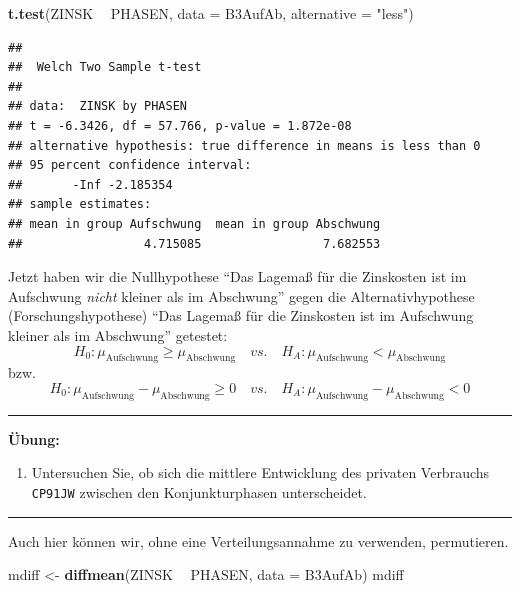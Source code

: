 \documentclass[12pt,ngerman,paper=a4,pagesize,DIV=13]{scrreprt}
\newenvironment{Shaded}{\begin{snugshade}}{\end{snugshade}}
\newcommand{\DataTypeTok}[1]{\textcolor[rgb]{0.13,0.29,0.53}{#1}}
\newcommand{\KeywordTok}[1]{\textcolor[rgb]{0.13,0.29,0.53}{\textbf{#1}}}
\newcommand{\NormalTok}[1]{#1}
\newcommand{\OperatorTok}[1]{\textcolor[rgb]{0.81,0.36,0.00}{\textbf{#1}}}
\newcommand{\StringTok}[1]{\textcolor[rgb]{0.31,0.60,0.02}{#1}}
\providecommand{\tightlist}{%
  \setlength{\itemsep}{0pt}\setlength{\parskip}{0pt}}
\begin{document}
\begin{Shaded}
\begin{Highlighting}[]
\KeywordTok{t.test}\NormalTok{(ZINSK }\OperatorTok{~}\StringTok{ }\NormalTok{PHASEN, }\DataTypeTok{data =}\NormalTok{ B3AufAb, }\DataTypeTok{alternative =} \StringTok{"less"}\NormalTok{)}
\end{Highlighting}
\end{Shaded}

\begin{verbatim}
## 
##  Welch Two Sample t-test
## 
## data:  ZINSK by PHASEN
## t = -6.3426, df = 57.766, p-value = 1.872e-08
## alternative hypothesis: true difference in means is less than 0
## 95 percent confidence interval:
##       -Inf -2.185354
## sample estimates:
## mean in group Aufschwung  mean in group Abschwung 
##                 4.715085                 7.682553
\end{verbatim}

Jetzt haben wir die Nullhypothese \enquote{Das Lagemaß für die
Zinskosten ist im Aufschwung \emph{nicht} kleiner als im Abschwung}
gegen die Alternativhypothese (Forschungshypothese) \enquote{Das Lagemaß
für die Zinskosten ist im Aufschwung kleiner als im Abschwung} getestet:
\[H_0: \mu_{\text{Aufschwung}} \geq \mu_{\text{Abschwung}} \quad vs. \quad H_A: \mu_{\text{Aufschwung}} < \mu_{\text{Abschwung}}\]
bzw.
\[H_0: \mu_{\text{Aufschwung}} - \mu_{\text{Abschwung}} \geq 0 \quad vs. \quad H_A: \mu_{\text{Aufschwung}} - \mu_{\text{Abschwung}} < 0 \]

\begin{center}\rule{0.5\linewidth}{\linethickness}\end{center}

\textbf{Übung:}

\begin{enumerate}
\def\labelenumi{\arabic{enumi}.}
\setcounter{enumi}{1}
\tightlist
\item
  Untersuchen Sie, ob sich die mittlere Entwicklung des privaten
  Verbrauchs \texttt{CP91JW} zwischen den Konjunkturphasen
  unterscheidet.
\end{enumerate}

\begin{center}\rule{0.5\linewidth}{\linethickness}\end{center}

Auch hier können wir, ohne eine Verteilungsannahme zu verwenden,
permutieren.

\begin{Shaded}
\begin{Highlighting}[]
\NormalTok{mdiff <-}\StringTok{ }\KeywordTok{diffmean}\NormalTok{(ZINSK }\OperatorTok{~}\StringTok{ }\NormalTok{PHASEN, }\DataTypeTok{data =}\NormalTok{ B3AufAb)}
\NormalTok{mdiff}
\end{Highlighting}
\end{Shaded}
\end{document}
